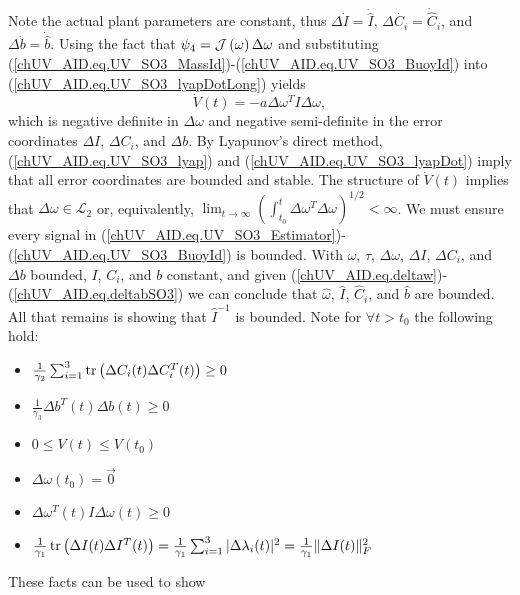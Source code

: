 %
Note the actual plant parameters are constant, thus $\Delta\dot{
  I}=\dot{\hat{I}}$, $\Delta\dot{ C_i}=\dot{\hat{C}}_i$, and
$\Delta\dot{ b}=\dot{\hat{b}}$.
%
Using the fact that $\psi_4=\mathcal{J}\left( \omega \right)\Delta\omega$ and
substituting
(\ref{chUV_AID.eq.UV_SO3_MassId})-(\ref{chUV_AID.eq.UV_SO3_BuoyId})
into (\ref{chUV_AID.eq.UV_SO3_lyapDotLong}) yields
%
\begin{equation}\label{chUV_AID.eq.UV_SO3_lyapDot}
\dot{V}(t)=-a\Delta \omega^T I \Delta \omega,
\end{equation}
%
\noindent which is negative definite in $\Delta \omega$ and negative
semi-definite in the error coordinates $\Delta I$, $\Delta
C_i$, and $\Delta b$.  By Lyapunov's direct method,
(\ref{chUV_AID.eq.UV_SO3_lyap}) and (\ref{chUV_AID.eq.UV_SO3_lyapDot})
imply that all error coordinates are bounded and stable.  The
structure of $\dot{V}(t)$ implies that $\Delta \omega \in \mathcal{L}_2$
or, equivalently, $\lim_{t\to\infty}\left( \int_{t_0}^t\Delta \omega^T
  \Delta \omega\right)^{1/2}<\infty$.  
%
We must ensure every signal in
(\ref{chUV_AID.eq.UV_SO3_Estimator})-(\ref{chUV_AID.eq.UV_SO3_BuoyId})
is bounded.  
%
With $\omega$, $\tau$, $\Delta \omega$, $\Delta I$, $\Delta C_i$,
and $\Delta b$ bounded, $I$, $C_i$, and $b$
constant, and given
(\ref{chUV_AID.eq.deltaw})-(\ref{chUV_AID.eq.deltabSO3}) we can
conclude that $\hat{\omega}$, $\hat{I}$, $\hat{C}_i$, and
$\hat{b}$ are bounded. All that remains is showing that $\hat{I}^{-1}$ is
bounded.
%
Note for $\forall t>t_0$ the following hold:
\begin{itemize}
\item 
$\frac{1}{\gamma_2}\sum_{i=1}^3\operatorname{tr}\left(\Delta C_i(t) \Delta
  C_i^T(t)\right)\geq 0$
\item 
$\frac{1}{\gamma_3}\Delta b^T(t) \Delta b(t) \geq 0$
\item 
$0 \leq V(t) \leq V(t_0)$
\item 
$\Delta \omega(t_0)=\vec{0}$ 
\item
$ \Delta \omega^T(t) I \Delta \omega (t)\geq 0$
\item 
$\frac{1}{\gamma_1}\operatorname{tr}\left(\Delta I(t) \Delta I^T(t)\right)=
\frac{1}{\gamma_1}\sum_{i=1}^3|\Delta\lambda_i(t)|^2=\frac{1}{\gamma_1}\|\Delta
I(t)\|_F^2$
\end{itemize}
%
These facts can be used to show
%
